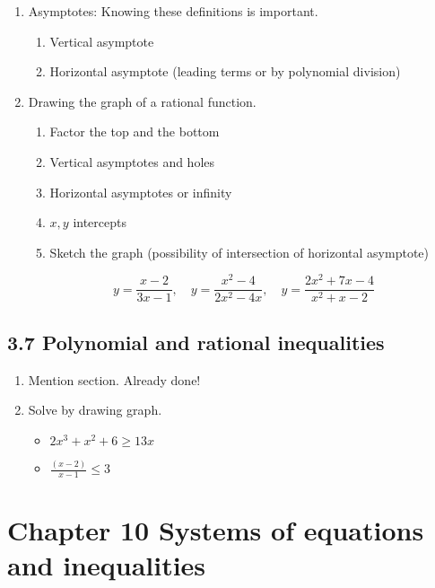 \documentclass{article}
\begin{document}
\begin{enumerate}
\begin{enumerate}
\item Asymptotes: Knowing these definitions is important.
\begin{enumerate}
\item Vertical asymptote 
\item Horizontal asymptote (leading terms or by polynomial division)
\end{enumerate}


\item Drawing the graph of a rational function.
\begin{enumerate}
\item Factor the top and the bottom
\item Vertical asymptotes and holes
\item Horizontal asymptotes or infinity
\item $x, y$ intercepts
\item Sketch the graph (possibility of intersection of horizontal asymptote)
\end{enumerate}
$$
y = \frac{x-2}{3x-1}, \quad y = \frac{x^2-4}{2x^2-4x}, \quad y= \frac{2x^2+7x-4}{x^2+x-2}
$$
\end{enumerate}
\end{enumerate}


\subsection{3.7 Polynomial and rational inequalities}

\begin{enumerate}
\item Mention section. Already done!
\item Solve by drawing graph.
\begin{itemize}
\item $2x^3 + x^2 +6 \geq 13x$
\item $\frac{(x-2)}{x-1}\leq 3$
\end{itemize}
\end{enumerate}


\section{Chapter 10 Systems of equations and inequalities}
\end{document}
